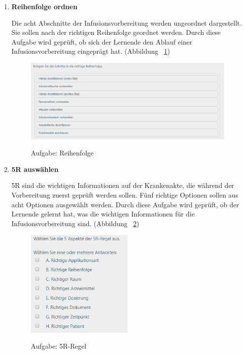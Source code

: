 \begin{enumerate}
    \item \textbf{Reihenfolge ordnen}
    
    Die acht Abschnitte der Infusionsvorbereitung werden ungeordnet dargestellt. Sie sollen nach der richtigen Reihenfolge geordnet werden. Durch diese Aufgabe wird geprüft, ob sich der Lernende den Ablauf einer Infusionsvorbereitung eingeprägt hat. (Abbildung ~\ref{fig:Aufgabe1})
    
\begin{figure}[ht]
\vspace*{1em}
\centering
\caption{Aufgabe: Reihenfolge}
\includegraphics[width=\textwidth]{images/Aufgabe1.png}
\label{fig:Aufgabe1} 
\end{figure}
    
    
    \item \textbf{5R auswählen}
    
    5R sind die wichtigen Informationen auf der Krankenakte, die während der Vorbereitung zuerst geprüft werden sollen. Fünf richtige Optionen sollen aus acht Optionen ausgewählt werden. Durch diese Aufgabe wird geprüft, ob der Lernende gelernt hat, was die wichtigen Informationen für die Infusionsvorbereitung sind. (Abbildung ~\ref{fig:Aufgabe2})
    
\begin{figure}[ht]
\vspace*{1em}
\centering
\caption{Aufgabe: 5R-Regel}
\includegraphics[width= 0.5\textwidth]{images/Aufgabe2.png}
\label{fig:Aufgabe2} 
\end{figure}
    

\end{enumerate}
